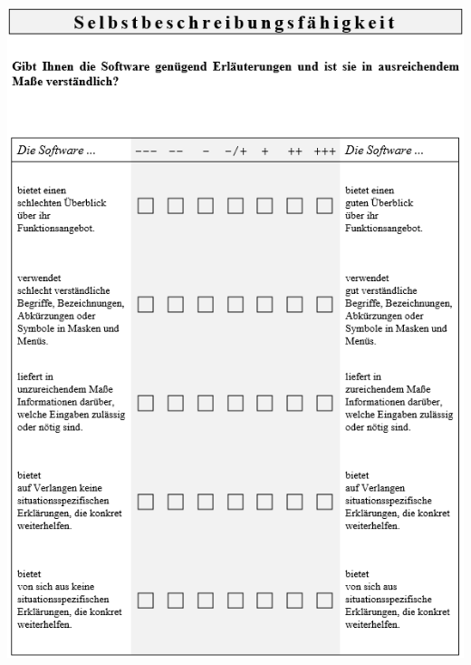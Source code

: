 \bigskip\noindent
\begin{minipage}{\textwidth}
  \centering
  \includegraphics{img/ISO9241-10Fragebogen_S2.PNG}
\end{minipage}


